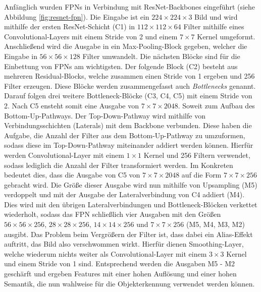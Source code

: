 Anfänglich wurden FPNs in Verbindung mit ResNet-Backbones eingeführt (siehe
Abbildung \ref{fig:resnet-fpn}). Die Eingabe ist ein $224 \times 224 \times 3$
Bild und wird mithilfe der ersten ResNet-Schicht (C1) in $112 \times 112 \times
64$ Filter mithilfe eines Convolutional-Layers mit einem Stride von 2 und einem
$7 \times 7$ Kernel umgeformt. Anschließend wird die Ausgabe in ein
Max-Pooling-Block gegeben, welcher die Eingabe in $56 \times 56 \times 128$
Filter umwandelt. Die nächsten Blöcke sind für die Einbettung von FPNs am
wichtigsten. Der folgende Block (C2) besteht aus mehreren Residual-Blocks,
welche zusammen einen Stride von 1 ergeben und 256 Filter erzeugen. Diese Blöcke
werden zusammengefasst auch \textit{Bottlenecks} genannt. Darauf folgen drei
weitere Bottleneck-Blöcke (C3, C4, C5) mit einem Stride von 2. Nach C5 ensteht
somit eine Ausgabe von $7 \times 7 \times 2048$. Soweit zum Aufbau des
Bottom-Up-Pathways. Der Top-Down-Pathway wird mithilfe von Verbindungsschichten
(Laterals) mit dem Backbone verbunden. Diese haben die Aufgabe, die Anzahl der
Filter aus dem Bottom-Up-Pathway zu umzuformen, sodass diese im Top-Down-Pathway
miteinander addiert werden können. Hierfür werden Convolutional-Layer mit einem
$1 \times 1$ Kernel und 256 Filtern verwendet, sodass lediglich die Anzahl der
Filter transformiert werden. Im Konkreten bedeutet dies, dass die Ausgabe von C5
von $7 \times 7 \times 2048$ auf die Form $7 \times 7 \times 256$ gebracht wird.
Die Größe dieser Ausgabe wird nun mithilfe von Upsampling (M5) verdoppelt und
mit der Ausgabe der Lateralverbindung von C4 addiert (M4). Dies wird mit den
übrigen Lateralverbindungen und Bottleneck-Blöcken verkettet wiederholt, sodass
das FPN schließlich vier Ausgaben mit den Größen $56 \times 56 \times 256$, $28
\times 28 \times 256$, $14 \times 14 \times 256$ und $7 \times 7 \times 256$
(M5, M4, M3, M2) ausgibt. Das Problem beim Vergrößern der Filter ist, dass dabei
ein Alias-Effekt auftritt, das Bild also verschwommen wirkt. Hierfür dienen
Smoothing-Layer, welche wiederum nichts weiter als Convolutional-Layer mit einem
$3 \times 3$ Kernel und einem Stride von 1 sind. Entsprechend werden die
Ausgaben M5 - M2 geschärft und ergeben Features mit einer hohen Auflösung und
einer hohen Semantik, die nun wahlweise für die Objekterkennung verwendet werden
können.

